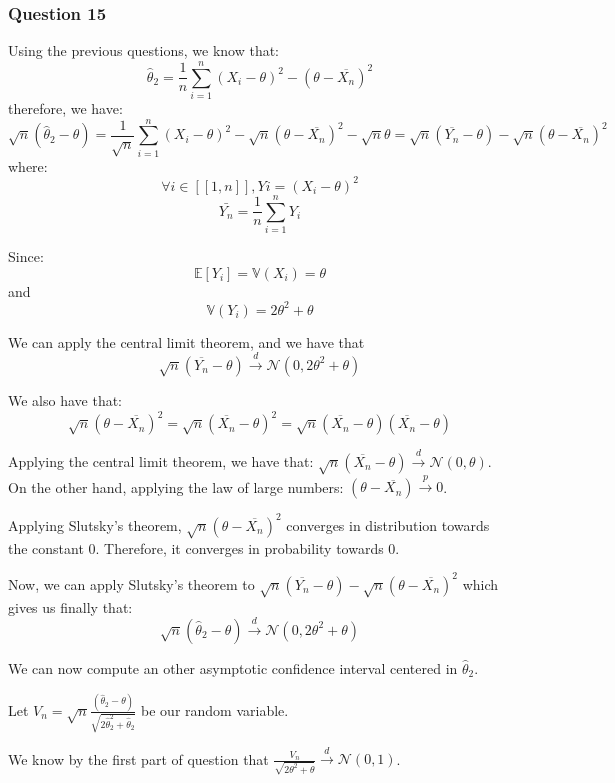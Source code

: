 \documentclass[]{article}
\begin{document}
\hypertarget{question-15}{%
\subsubsection{Question 15}\label{question-15}}

Using the previous questions, we know that:
\[\hat\theta_{2} = \frac{1}{n} \sum_{i=1}^{n} (X_i - \theta)^2 - (\theta - \overline{X_n})^2\]
therefore, we have: \[
\sqrt{n} (\hat\theta_{2} - \theta) = \frac{1}{\sqrt{n}} \sum_{i=1}^{n} (X_i - \theta)^2 - \sqrt{n} (\theta - \overline{X_n})^2 - \sqrt{n} \theta = \sqrt{n} (\overline{Y_n} - \theta) -  \sqrt{n} (\theta - \overline{X_n})^2
\] where: \[\forall i \in[\![1,n]\!], Yi = (X_i - \theta)^2 \]
\[\bar{Y_n} = \frac{1}{n} \sum_{i=1}^{n}Y_i \]

Since: \[
\mathbb{E}[Y_i] = \mathbb{V}(X_i) = \theta
\] and \[
\mathbb{V}(Y_i) = 2\theta^2 + \theta
\]

We can apply the central limit theorem, and we have that
\[\sqrt{n} (\overline{Y_n} - \theta) \overset{d} {\to} \mathcal{N}(0,2\theta^2 + \theta)\]

We also have that: \[
\sqrt{n} (\theta - \overline{X_n})^2 = \sqrt{n} (\overline{X_n} - \theta)^2 = \sqrt{n} (\overline{X_n} - \theta)(\overline{X_n} - \theta)
\]

Applying the central limit theorem, we have that:
\(\sqrt{n} (\overline{X_n} - \theta) \overset{d} {\to} \mathcal{N}(0,\theta)\).\\
On the other hand, applying the law of large numbers:
\((\theta - \overline{X_n})\overset{p} {\to} 0\).

Applying Slutsky's theorem, \(\sqrt{n} (\theta - \overline{X_n})^2\)
converges in distribution towards the constant 0. Therefore, it
converges in probability towards 0.

Now, we can apply Slutsky's theorem to
\(\sqrt{n} (\overline{Y_n} - \theta) - \sqrt{n} (\theta - \overline{X_n})^2\)
which gives us finally that:
\[\sqrt{n} (\hat\theta_{2} - \theta) \overset{d} {\to} \mathcal{N}(0,2\theta^2 + \theta)\]

We can now compute an other asymptotic confidence interval centered in
\(\hat \theta_2\).

Let
\(V_n = \sqrt{n}\frac{(\hat\theta_{2}-\theta)}{\sqrt{2\hat\theta_{2}^2 + \hat\theta_{2}}}\)
be our random variable.

We know by the first part of question that
\(\frac{V_n}{\sqrt{2\theta^2 + \theta}} \overset{d} {\to} \mathcal{N}(0,1)\).
\end{document}
